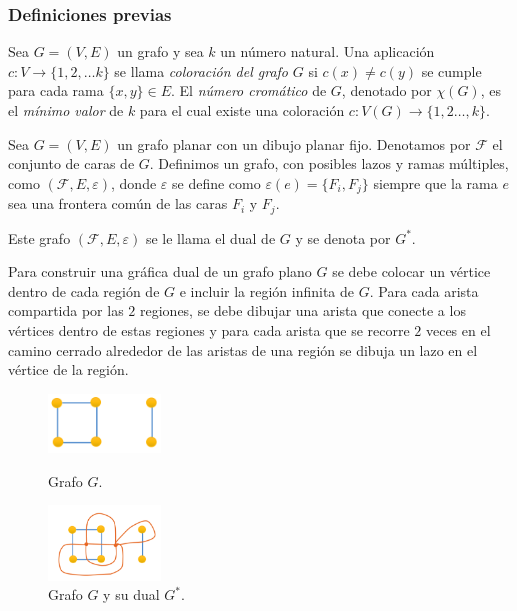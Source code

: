 \documentclass[spanish, utf8,handout]{beamer} %
\theoremstyle{definition}
\begin{document}
\begin{frame}[allowframebreaks]
\frametitle{Definiciones previas}

\begin{definition} 
Sea $G=(V,E)$ un grafo y sea $k$ un número natural. Una aplicación $c\colon V\to \{1,2,\ldots k\}$ se llama \emph{\color{DarkBlue}coloración del grafo} $G$ si $c(x)\neq c(y)$ se cumple para cada rama $\{x,y\}\in E$. \linebreak El \emph{\color{DarkBlue}número cromático} de $G$, denotado por $\chi(G)$, es el \emph{\color{red}mínimo valor} de $k$ para el cual existe una coloración $c\colon V(G)\to\{1,2\ldots,k\}$.
\end{definition}

\begin{definition}
Sea $G=(V,E)$ un grafo planar con un dibujo planar fijo. Denotamos por $\mathcal{F}$ el conjunto de caras de $G$. Definimos un grafo, con posibles lazos y ramas múltiples, como $(\mathcal{F},E,\varepsilon)$, donde $\varepsilon$ se define como $\varepsilon(e)=\{F_i,F_j\}$ siempre que la rama $e$ sea una frontera común de las caras $F_i$ y $F_j$.

Este grafo $\left(\mathcal{F},E,\varepsilon\right)$ se le llama el dual de $G$ y se denota por $G^{\ast}$.	
\end{definition}


\begin{example}
Para construir una gráfica dual de un grafo plano $G$ se debe colocar un vértice dentro de cada región de $G$ e incluir la región infinita de $G$. Para cada arista compartida por las $2$ regiones, se debe dibujar una arista que conecte a los vértices dentro de estas regiones y para cada arista que se recorre $2$ veces en el camino cerrado alrededor de las aristas de una región se dibuja un lazo en el vértice de la región. 
\end{example}

\begin{figure}[H]
	\captionsetup{justification=centering,margin=0.5cm}
	\centering
	\begin{minipage}{.5\textwidth}
		\centering
		\includegraphics[width=3cm]{example1}
		\caption{Grafo $G$.}
	\end{minipage}%
	\begin{minipage}{0.5\textwidth}
		\centering
		\includegraphics[width=3cm]{example2}
		\caption{Grafo $G$ y su dual $G^{\ast}$.}
	\end{minipage}
\end{figure}


\end{frame}
\end{document}

